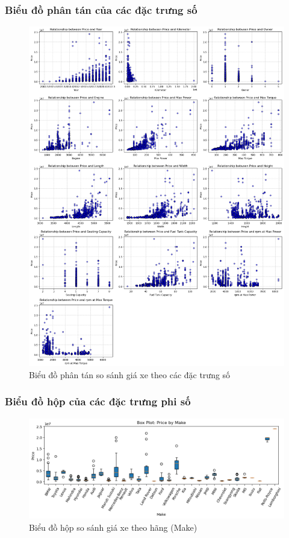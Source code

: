 \subsubsection{Biểu đồ phân tán của các đặc trưng số}
\begin{figure}[H]
    \centering
    \includegraphics[width=0.9\linewidth]{img/scatter-plot.png}
    \caption{Biểu đồ phân tán so sánh giá xe theo các đặc trưng số}
    \label{fig:scatter-plot}
\end{figure}

\subsubsection{Biểu đồ hộp của các đặc trưng phi số}
\begin{figure}[H]
    \centering
    \includegraphics[width=1\linewidth]{img/boxplot-make.png}
    \caption{Biểu đồ hộp so sánh giá xe theo hãng (Make)}
    \label{fig:boxplot-make}
\end{figure}

